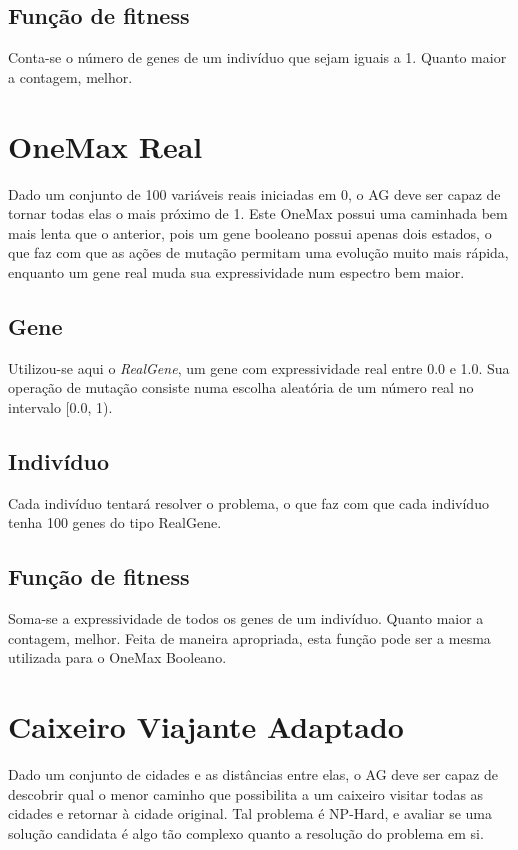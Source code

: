 \subsection*{Função de fitness}

Conta-se o número de genes de um indivíduo que sejam iguais a 1. Quanto maior a contagem, melhor.

\section{OneMax Real}

Dado um conjunto de 100 variáveis reais iniciadas em 0, o AG deve ser capaz de tornar todas elas o mais próximo de 1. Este OneMax possui uma caminhada bem mais lenta que o anterior, pois um gene booleano possui apenas dois estados, o que faz com que as ações de mutação permitam uma evolução muito mais rápida, enquanto um gene real muda sua expressividade num espectro bem maior.

\subsection*{Gene}

Utilizou-se aqui o \emph{RealGene}, um gene com expressividade real entre 0.0 e 1.0. Sua operação de mutação consiste numa escolha aleatória de um número real no intervalo [0.0, 1).

\subsection*{Indivíduo}

Cada indivíduo tentará resolver o problema, o que faz com que cada indivíduo tenha 100 genes do tipo RealGene.

\subsection*{Função de fitness}

Soma-se a expressividade de todos os genes de um indivíduo. Quanto maior a contagem, melhor. Feita de maneira apropriada, esta função pode ser a mesma utilizada para o OneMax Booleano.

\section{Caixeiro Viajante Adaptado}

Dado um conjunto de cidades e as distâncias entre elas, o AG deve ser capaz de descobrir qual o menor caminho que possibilita a um caixeiro visitar todas as cidades e retornar à cidade original. Tal problema é NP-Hard, e avaliar se uma solução candidata é algo tão complexo quanto a resolução do problema em si.

